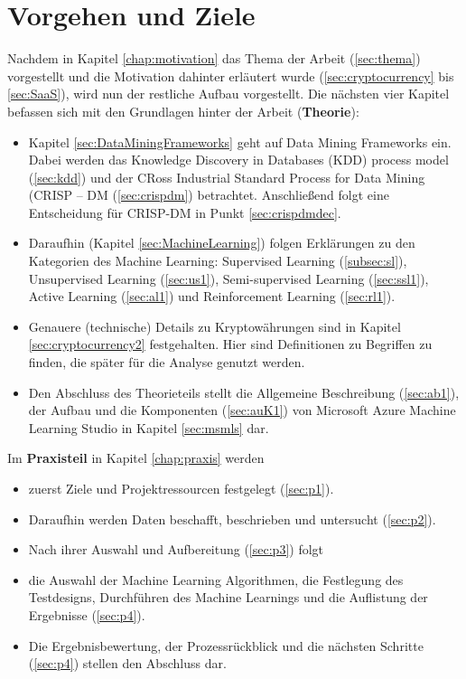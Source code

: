 \chapter{Vorgehen und Ziele}\label{chapter:Vorgehen}
Nachdem in Kapitel \ref{chap:motivation} das Thema der Arbeit (\ref{sec:thema}) vorgestellt und die Motivation dahinter erläutert wurde (\ref{sec:cryptocurrency} bis \ref{sec:SaaS}), wird nun der restliche Aufbau vorgestellt.
Die nächsten vier Kapitel befassen sich mit den Grundlagen hinter der Arbeit (\textbf{Theorie}): 
\begin{itemize}
\item Kapitel \ref{sec:DataMiningFrameworks} geht auf Data Mining Frameworks ein. Dabei werden das Knowledge Discovery in Databases (KDD) process model (\ref{sec:kdd}) und der CRoss Industrial Standard Process for Data Mining (CRISP – DM (\ref{sec:crispdm}) betrachtet. Anschließend folgt eine Entscheidung für CRISP-DM in Punkt \ref{sec:crispdmdec}.
\item Daraufhin (Kapitel \ref{sec:MachineLearning}) folgen Erklärungen zu den Kategorien des Machine Learning: Supervised Learning (\ref{subsec:sl}), Unsupervised Learning (\ref{sec:us1}), Semi-supervised Learning (\ref{sec:ssl1}), Active Learning (\ref{sec:al1}) und Reinforcement Learning (\ref{sec:rl1}).
\item Genauere (technische) Details zu Kryptowährungen sind in Kapitel \ref{sec:cryptocurrency2} festgehalten. Hier sind Definitionen zu Begriffen zu finden, die später für die Analyse genutzt werden.
\item Den Abschluss des Theorieteils stellt die Allgemeine Beschreibung (\ref{sec:ab1}), der Aufbau und die Komponenten (\ref{sec:auK1}) von Microsoft Azure Machine Learning Studio in Kapitel \ref{sec:msmls} dar.
\end{itemize}
Im \textbf{Praxisteil} in Kapitel \ref{chap:praxis} werden
\begin{itemize}
\item zuerst Ziele und Projektressourcen festgelegt (\ref{sec:p1}).
\item Daraufhin werden Daten beschafft, beschrieben und untersucht (\ref{sec:p2}).
\item Nach ihrer Auswahl und Aufbereitung (\ref{sec:p3}) folgt
\item die Auswahl der Machine Learning Algorithmen, die Festlegung des Testdesigns, Durchführen des Machine Learnings und die Auflistung der Ergebnisse (\ref{sec:p4}).
\item Die Ergebnisbewertung, der Prozessrückblick und die nächsten Schritte (\ref{sec:p4}) stellen den Abschluss dar.
\end{itemize}
